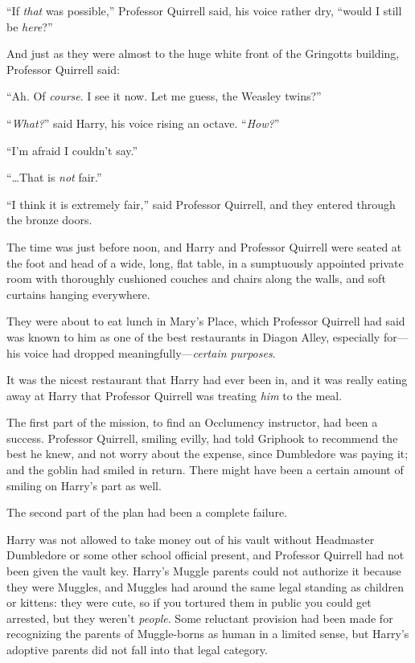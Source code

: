 “If \emph{that} was possible,” Professor Quirrell said, his voice rather dry, “would I still be \emph{here}?”

And just as they were almost to the huge white front of the Gringotts building, Professor Quirrell said:

“Ah. Of \emph{course}. I see it now. Let me guess, the Weasley twins?”

“\emph{What?}” said Harry, his voice rising an octave.
“\emph{How?}”

“I’m afraid I couldn’t say.”

“…That is \emph{not} fair.”

“I think it is extremely fair,” said Professor Quirrell, and they entered through the bronze doors.

\later

The time was just before noon, and Harry and Professor Quirrell were seated at the foot and head of a wide, long, flat table, in a sumptuously appointed private room with thoroughly cushioned couches and chairs along the walls, and soft curtains hanging everywhere.

They were about to eat lunch in Mary’s Place, which Professor Quirrell had said was known to him as one of the best restaurants in Diagon Alley, especially for—his voice had dropped meaningfully—\emph{certain purposes}.

It was the nicest restaurant that Harry had ever been in, and it was really eating away at Harry that Professor Quirrell was treating \emph{him} to the meal.

The first part of the mission, to find an Occlumency instructor, had been a success. Professor Quirrell, smiling evilly, had told Griphook to recommend the best he knew, and not worry about the expense, since Dumbledore was paying it; and the goblin had smiled in return. There might have been a certain amount of smiling on Harry’s part as well.

The second part of the plan had been a complete failure.

Harry was not allowed to take money out of his vault without Headmaster Dumbledore or some other school official present, and Professor Quirrell had not been given the vault key. Harry’s Muggle parents could not authorize it because they were Muggles, and Muggles had around the same legal standing as children or kittens: they were cute, so if you tortured them in public you could get arrested, but they weren’t \emph{people}. Some reluctant provision had been made for recognizing the parents of Muggle-borns as human in a limited sense, but Harry’s adoptive parents did not fall into that legal category.

